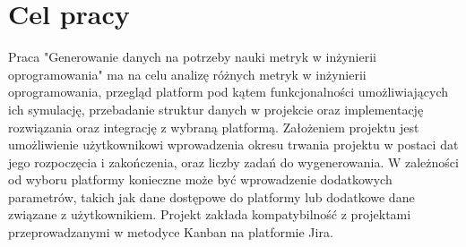 \section*{Cel pracy}
Praca "Generowanie danych na potrzeby nauki metryk w inżynierii oprogramowania" ma na celu analizę różnych metryk w inżynierii oprogramowania, przegląd platform pod kątem funkcjonalności umożliwiających
ich symulację, przebadanie struktur danych w projekcie oraz implementację rozwiązania oraz integrację z wybraną platformą.
Założeniem projektu jest umożliwienie użytkownikowi wprowadzenia okresu trwania projektu w postaci dat jego rozpoczęcia i zakończenia, oraz liczby zadań do wygenerowania.
W zależności od wyboru platformy konieczne może być wprowadzenie dodatkowych parametrów, takich jak dane dostępowe do platformy lub dodatkowe dane związane z użytkownikiem.
Projekt zakłada kompatybilność z projektami przeprowadzanymi w metodyce Kanban na platformie Jira.
